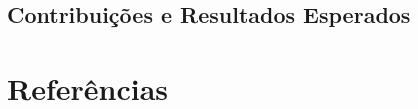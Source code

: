 \documentclass[
	12pt,				%
	openright,			%
	twoside,			%
	a4paper,			%
	english,			%
	brazil				%
	]{abntex2}
\begin{document}
\chapter{Contribuições e Resultados Esperados}\label{cap_contribuicoes_e_resultados_esperados}



\postextual


\part{Referências}







%
%


\printindex
\end{document}
